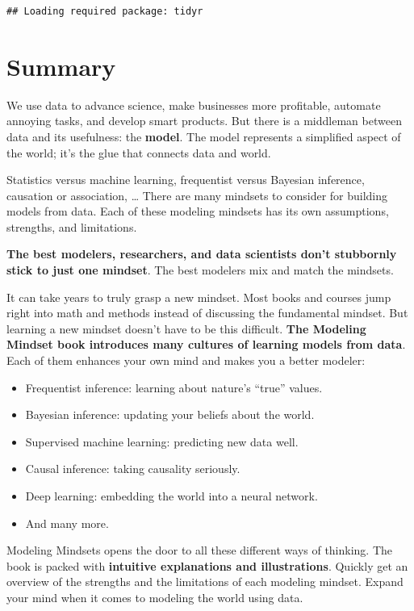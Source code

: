 \documentclass[
  10pt,
]{scrbook}
\providecommand{\tightlist}{%
  \setlength{\itemsep}{0pt}\setlength{\parskip}{0pt}}
\begin{document}
\begin{verbatim}
## Loading required package: tidyr
\end{verbatim}

\hypertarget{summary}{%
\chapter*{Summary}\label{summary}}


We use data to advance science, make businesses more profitable, automate annoying tasks, and develop smart products.
But there is a middleman between data and its usefulness: the \textbf{model}.
The model represents a simplified aspect of the world; it's the glue that connects data and world.

Statistics versus machine learning, frequentist versus Bayesian inference, causation or association, \ldots{}
There are many mindsets to consider for building models from data.
Each of these modeling mindsets has its own assumptions, strengths, and limitations.

\textbf{The best modelers, researchers, and data scientists don't stubbornly stick to just one mindset}.
The best modelers mix and match the mindsets.

It can take years to truly grasp a new mindset.
Most books and courses jump right into math and methods instead of discussing the fundamental mindset.
But learning a new mindset doesn't have to be this difficult.
\textbf{The Modeling Mindset book introduces many cultures of learning models from data}.
Each of them enhances your own mind and makes you a better modeler:

\begin{itemize}
\tightlist
\item
  Frequentist inference: learning about nature's ``true'' values.
\item
  Bayesian inference: updating your beliefs about the world.
\item
  Supervised machine learning: predicting new data well.
\item
  Causal inference: taking causality seriously.
\item
  Deep learning: embedding the world into a neural network.
\item
  And many more.
\end{itemize}

Modeling Mindsets opens the door to all these different ways of thinking.
The book is packed with \textbf{intuitive explanations and illustrations}.
Quickly get an overview of the strengths and the limitations of each modeling mindset.
Expand your mind when it comes to modeling the world using data.
\end{document}
